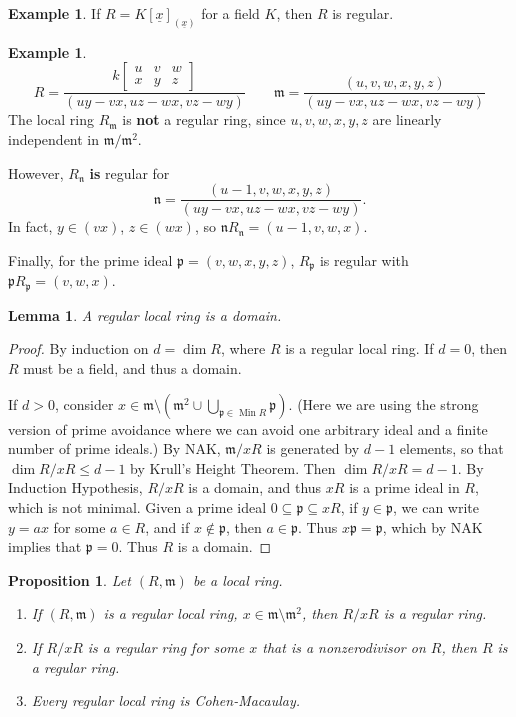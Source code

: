 \documentclass[11pt]{book}
\newtheorem{lemma}[theorem]{Lemma}
\newtheorem{proposition}[theorem]{Proposition}
\numberwithin{equation}{section}
\numberwithin{theorem}{chapter}
\theoremstyle{definition}
\newtheorem{example}[theorem]{Example}
\newtheorem*{basic properties}{Basic Properties}
\newtheorem*{Important Remark}{Important Remark}
\theoremstyle{remark}
\newcommand{\m}{\mathfrak{m}}
\newcommand{\Min}{\operatorname{Min}}
\renewcommand{\dim}{\operatorname{dim}}
\begin{document}
\begin{example}
	If $R=K[\underline{x}]_{(\underline{x})}$ for a field $K$, then $R$ is regular.
\end{example}

\begin{example}
	$$R = \frac{k\begin{bmatrix} u & v & w \\ x & y & z\end{bmatrix}}{(uy-vx,uz-wx,vz-wy)} \qquad \m = \frac{(u,v,w,x,y,z)}{(uy-vx,uz-wx,vz-wy)}$$
	The local ring $R_\m$ is {\bf not} a regular ring, since $u, v, w, x, y, z$ are linearly independent in $\m/\m^2$.
	
	However, $R_{\mathfrak{n}}$ {\bf is} regular for
	$$\mathfrak{n} = \frac{(u-1,v,w,x,y,z)}{{(uy-vx,uz-wx,vz-wy)}}.$$
	In fact, $y \in (vx)$, $z \in (wx)$, so $\mathfrak{n} R_{\mathfrak{n}} = (u-1, v, w, x)$.
	
	Finally, for the prime ideal $\mathfrak{p} = (v,w,x,y,z)$, $R_{\mathfrak{p}}$ is regular with $\mathfrak{p} R_{\mathfrak{p}} = (v,w,x)$.
\end{example}


\begin{lemma}
	A regular local ring is a domain.
\end{lemma}

\begin{proof}
	By induction on $d = \dim R$, where $R$ is a regular local ring. If $d=0$, then $R$ must be a field, and thus a domain.
	
	If $d>0$, consider $x \in \m \setminus \left( \m^2 \cup \bigcup_{\mathfrak{p} \in \Min R} \mathfrak{p} \right)$. (Here we are using the strong version of prime avoidance where we can avoid one arbitrary ideal and a finite number of prime ideals.) By NAK, $\m/xR$ is generated by $d-1$ elements, so that $\dim R/xR \leqslant d-1$ by Krull's Height Theorem. Then $\dim R/xR = d-1$. By Induction Hypothesis, $R/xR$ is a domain, and thus $xR$ is a prime ideal in $R$, which is not minimal. Given a prime ideal $0 \subseteq \mathfrak{p} \subseteq xR$, if $y \in \mathfrak{p}$, we can write $y =ax$ for some $a \in R$, and if $x \notin \mathfrak{p}$, then $a \in \mathfrak{p}$. Thus $x \mathfrak{p} = \mathfrak{p}$, which by NAK implies that $\mathfrak{p} = 0$. Thus $R$ is a domain.
\end{proof}


\begin{proposition}\label{regular mod x}
Let $(R, \m)$ be a local ring.
\begin{enumerate}[1)]
	\item If $(R, \m)$ is a regular local ring, $x \in \m \setminus \m^2$, then $R/xR$ is a regular ring.
	\item If $R/xR$ is a regular ring for some $x$ that is a nonzerodivisor on $R$, then $R$ is a regular ring.
	\item Every regular local ring is Cohen-Macaulay.
\end{enumerate}
\end{proposition}
\end{document}
